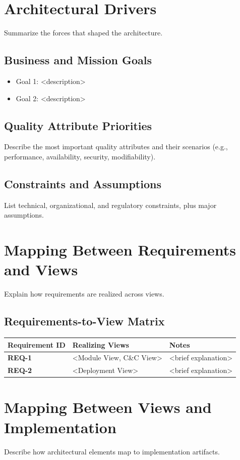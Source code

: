 \documentclass[11pt]{article}
\begin{document}
\section{Architectural Drivers}
Summarize the forces that shaped the architecture.

\subsection*{Business and Mission Goals}
\begin{itemize}
  \item Goal 1: <description>
  \item Goal 2: <description>
\end{itemize}

\subsection*{Quality Attribute Priorities}
Describe the most important quality attributes and their scenarios
(e.g., performance, availability, security, modifiability).

\subsection*{Constraints and Assumptions}
List technical, organizational, and regulatory constraints, plus
major assumptions.

\section{Mapping Between Requirements and Views}
Explain how requirements are realized across views.

\subsection*{Requirements-to-View Matrix}
\begin{longtable}{>{\bfseries}p{} p{} p{}}
Requirement ID & Realizing Views & Notes \\
\hline
REQ-1 & <Module View, C\&C View> & <brief explanation> \\
REQ-2 & <Deployment View> & <brief explanation> \\
\end{longtable}

\section{Mapping Between Views and Implementation}
Describe how architectural elements map to implementation artifacts.
\end{document}
